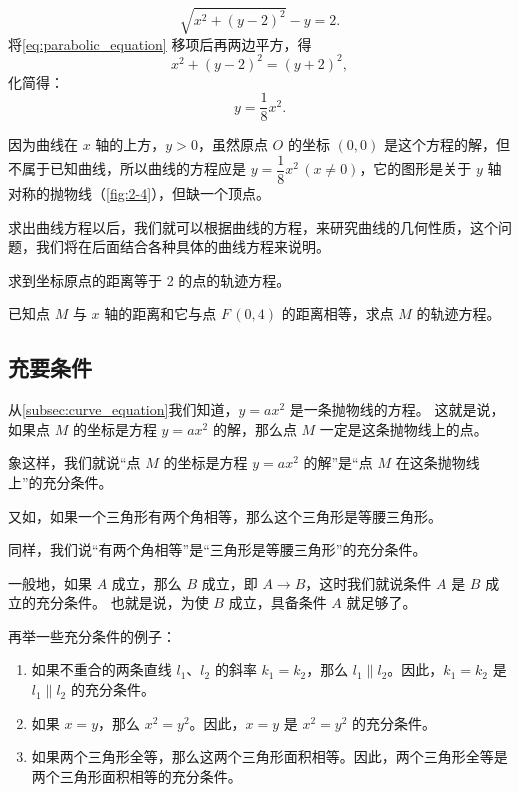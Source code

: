 \medskip
\begin{equation}
  \label{eq:parabolic_equation}
  \sqrt{x^2+(y-2)^2}-y=2.
\end{equation}
将\cref{eq:parabolic_equation} 移项后再两边平方，得
\[x^2+(y-2)^2 =(y+2)^2,\]
化简得：
\[y=\frac{1}{8}x^2.\]

因为曲线在 $x$ 轴的上方，$y>0$，虽然原点 $O$ 的坐标 $(0,0)$ 是这个方程的解，但不属于已知曲线，所以曲线的方程应是 $y=\dfrac{1}{8}x^2\,(x\neq 0)$，它的图形是关于 $y$ 轴对称的抛物线（\cref{fig:2-4}），但缺一个顶点。

求出曲线方程以后，我们就可以根据曲线的方程，来研究曲线的几何性质，这个问题，我们将在后面结合各种具体的曲线方程来说明。

\begin{Practice}
  \begin{question}
    \item 求到坐标原点的距离等于 2 的点的轨迹方程。
    \item 已知点 $M$ 与 $x$ 轴的距离和它与点 $F\,(0,4)$ 的距离相等，求点 $M$ 的轨迹方程。
  \end{question}
\end{Practice}

\subsection{充要条件}
从\cref{subsec:curve_equation}我们知道，$y=ax^2$ 是一条抛物线的方程。
这就是说，如果点 $M$ 的坐标是方程 $y=ax^2$ 的解，那么点 $M$ 一定是这条抛物线上的点。

象这样，我们就说“点 $M$ 的坐标是方程 $y=ax^2$ 的解”是“点 $M$ 在这条抛物线上”的充分条件。

又如，如果一个三角形有两个角相等，那么这个三角形是等腰三角形。

同样，我们说“有两个角相等”是“三角形是等腰三角形”的充分条件。

一般地，如果 $A$ 成立，那么 $B$ 成立，即 $A \to B$，这时我们就说条件 $A$ 是 $B$ 成立的充分条件。
也就是说，为使 $B$ 成立，具备条件 $A$ 就足够了。

再举一些充分条件的例子：
\begin{enumerate}
  \item 如果不重合的两条直线 $l_1$、$l_2$ 的斜率 $k_1=k_2$，那么 $l_1\parallel l_2$。因此，$k_1=k_2$ 是 $l_1\parallel l_2$ 的充分条件。
  \item 如果 $x=y$，那么 $x^2=y^2$。因此，$x=y$ 是 $x^2=y^2$ 的充分条件。
  \item 如果两个三角形全等，那么这两个三角形面积相等。因此，两个三角形全等是两个三角形面积相等的充分条件。
\end{enumerate}

